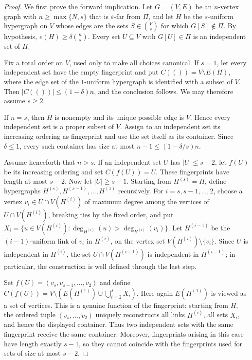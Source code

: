 \documentclass[11pt,reqno,letterpaper]{amsart}
\theoremstyle{plain}
\theoremstyle{remark}
\begin{document}
\begin{proof}
We first prove the forward implication.  Let $G=(V,E)$ be an $n$-vertex graph
with $n\geq\max\{N,s\}$ that is $\varepsilon$-far from $\Pi$, and let $H$ be the
$s$-uniform hypergraph on $V$ whose edges are the sets $S\in\binom Vs$ for
which $G[S]\notin\Pi$.  By hypothesis,
$e(H)\geq\delta\binom ns$.  Every set $U\subseteq V$ with $G[U]\in\Pi$ is an
independent set of $H$.

Fix a total order on $V$, used only to make all choices canonical.  If $s=1$,
let every independent set have the empty fingerprint and put
$C(())=V\setminus E(H)$, where the edge set of the $1$-uniform hypergraph is
identified with a subset of $V$.  Then
$|C(())|\leq(1-\delta)n$, and the conclusion follows.  We may therefore assume
$s\geq2$.

If $n=s$, then $H$ is nonempty and its unique possible edge is $V$.  Hence
every independent set is a proper subset of $V$.  Assign to an independent set
its increasing ordering as fingerprint and use the set itself as its
container.  Since $\delta\leq1$, every such container has size at most
$n-1\leq(1-\delta/s)n$.

Assume henceforth that $n>s$.  If an independent set $U$ has
$|U|\leq s-2$, let $f(U)$ be its increasing ordering and set $C(f(U))=U$.
These fingerprints have length at most $s-2$.  Now let $|U|\geq s-1$.
Starting from $H^{(s)}=H$, define hypergraphs
$H^{(s)},H^{(s-1)},\ldots,H^{(1)}$ recursively.  For
$i=s,s-1,\ldots,2$, choose a vertex
$v_i\in U\cap V(H^{(i)})$ of maximum degree among the vertices of
$U\cap V(H^{(i)})$, breaking ties by the fixed order, and put
\(X_i=\{u\in V(H^{(i)}): \deg_{H^{(i)}}(u)>\deg_{H^{(i)}}(v_i)\}.\)
Let $H^{(i-1)}$ be the $(i-1)$-uniform link of $v_i$ in $H^{(i)}$, on the
vertex set $V(H^{(i)})\setminus\{v_i\}$.  Since $U$ is independent in
$H^{(i)}$, the set $U\cap V(H^{(i-1)})$ is independent in $H^{(i-1)}$; in
particular, the construction is well defined through the last step.

Set
\(f(U)=(v_s,v_{s-1},\ldots,v_2)
\)
and define
\(C(f(U)) =V\setminus\left(E(H^{(1)})\cup\bigcup_{i=2}^{s}X_i\right).\)
Here again $E(H^{(1)})$ is viewed as a set of vertices.  This is a genuine
function of the fingerprint: starting from $H$, the ordered tuple
$(v_s,\ldots,v_2)$ uniquely reconstructs all links $H^{(i)}$, all sets $X_i$,
and hence the displayed container.  Thus two independent sets with the same
fingerprint receive the same container.  Moreover, fingerprints arising in
this case have length exactly $s-1$, so they cannot coincide with the
fingerprints used for sets of size at most $s-2$.


\end{proof}
\end{document}
